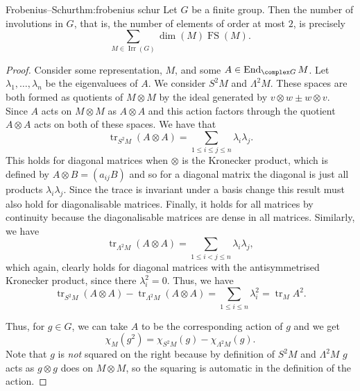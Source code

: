 \documentclass[fleqn]{NotesClass}
\DeclareMathOperator{\End}{End}
\DeclareMathOperator{\Irr}{Irr}
\DeclareMathOperator{\tr}{tr}
\DeclareMathOperator{\frobeniusSchur}{FS}
\begin{document}
    \begin{thm}{Frobenius--Schur}{thm:frobenius schur}
        Let \(G\) be a finite group.
        Then the number of involutions in \(G\), that is, the number of elements of order at most \(2\), is precisely
        \begin{equation}
            \sum_{M \in \Irr(G)} \dim(M) \frobeniusSchur(M).
        \end{equation}
        \begin{proof}
            Consider some representation, \(M\), and some \(A \in \End_{\complex G}M\).
            Let \(\lambda_1, \dotsc, \lambda_n\) be the eigenvaluees of \(A\).
            We consider \(S^2M\) and \(\Lambda^2M\).
            These spaces are both formed as quotients of \(M \otimes M\) by the ideal generated by \(v \otimes w \pm w \otimes v\).
            Since \(A\) acts on \(M \otimes M\) as \(A \otimes A\) and this action factors through the quotient \(A \otimes A\) acts on both of these spaces.
            We have that
            \begin{equation}
                \tr_{S^2 M}(A \otimes A) = \sum_{1 \le i \le j \le n} \lambda_i \lambda_j.
            \end{equation}
            This holds for diagonal matrices when \(\otimes\) is the Kronecker product, which is defined by \(A \otimes B = (a_{ij}B)\) and so for a diagonal matrix the diagonal is just all products \(\lambda_i \lambda_j\).
            Since the trace is invariant under a basis change this result must also hold for diagonalisable matrices.
            Finally, it holds for all matrices by continuity because the diagonalisable matrices are dense in all matrices.
            Similarly, we have
            \begin{equation}
                \tr_{\Lambda^2 M}(A \otimes A) = \sum_{1 \le i < j \le n} \lambda_i \lambda_j,
            \end{equation}
            which again, clearly holds for diagonal matrices with the antisymmetrised Kronecker product, since there \(\lambda_i^2 = 0\).
            Thus, we have
            \begin{equation}
                \tr_{S^2M} (A \otimes A) - \tr_{\Lambda^2 M}(A \otimes A) = \sum_{1 \le i \le n} \lambda_i^2 = \tr_{M} A^2.
            \end{equation}
            
            Thus, for \(g \in G\), we can take \(A\) to be the corresponding action of \(g\) and we get
            \begin{equation}
                \chi_M(g^2) = \chi_{S^2M}(g) - \chi_{\Lambda^2M}(g).
            \end{equation}
            Note that \(g\) is \emph{not} squared on the right because by definition of \(S^2M\) and \(\Lambda^2M\) \(g\) acts as \(g \otimes g\) does on \(M \otimes M\), so the squaring is automatic in the definition of the action.
            

\end{proof}
\end{thm}
\end{document}
